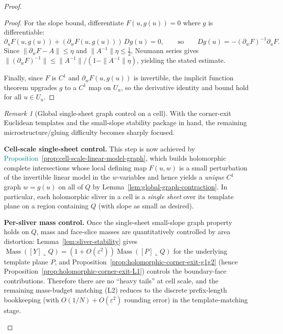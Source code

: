 \documentclass[11pt]{article}
\newcommand{\REVMZ}[1]{\textcolor{teal}{#1}}  %
\numberwithin{equation}{section}  %
\theoremstyle{plain}
\theoremstyle{definition}
\theoremstyle{remark}
\newtheorem{remark}[theorem]{Remark}
\DeclareMathOperator{\Mass}{Mass}
\begin{document}
\begin{proof}
\begin{proof}
For the slope bound, differentiate $F(u,g(u))=0$ where $g$ is differentiable:
\[
\partial_uF(u,g(u)) + (\partial_wF(u,g(u)))\,Dg(u)=0,
\qquad\text{so}\qquad
Dg(u)=-(\partial_wF)^{-1}\partial_uF.
\]
Since $\|\partial_wF-A\|\le \eta$ and $\|A^{-1}\|\eta\le \tfrac12$, Neumann series gives
$\|(\partial_wF)^{-1}\|\le \|A^{-1}\|/(1-\|A^{-1}\|\eta)$, yielding the stated estimate.


Finally, since $F$ is $C^1$ and $\partial_wF(u,g(u))$ is invertible, the implicit function theorem upgrades $g$ to a $C^1$ map on $U_u$, so the derivative identity and bound hold for all $u\in U_u$.


\end{proof}


\begin{remark}[Global single-sheet graph control on a cell]\label{rem:graph-whole-cell}
With the corner-exit Euclidean templates and the small-slope stability package in hand, the remaining microstructure/gluing
difficulty becomes sharply focused.

\smallskip\noindent

\textbf{Cell-scale single-sheet control.}
This step is now achieved by \REVMZ{Proposition~\ref{prop:cell-scale-linear-model-graph}}, which builds holomorphic complete intersections
whose local defining map $F(u,w)$ is a small perturbation of the invertible linear model in the $w$-variables and hence yields a \emph{unique}
$C^1$ graph $w=g(u)$ on all of $Q$ by Lemma~\ref{lem:global-graph-contraction}.
In particular, each holomorphic sliver in a cell is a \emph{single sheet} over its template plane on a region containing $Q$ (with slope as small as desired).

\smallskip\noindent
\textbf{Per-sliver mass control.}
Once the single-sheet small-slope graph property holds on $Q$, mass and face-slice masses are quantitatively controlled by area distortion:
Lemma~\ref{lem:sliver-stability} gives $\Mass([Y]\llcorner Q)=(1+O(\varepsilon^2))\Mass([P]\llcorner Q)$ for the underlying template plane $P$,
and Proposition~\ref{prop:holomorphic-corner-exit-g1g2} (hence Proposition~\ref{prop:holomorphic-corner-exit-L1}) controls the boundary-face contributions.
Therefore there are no ``heavy tails'' at cell scale, and the remaining mass-budget matching (L2) reduces to the discrete prefix-length bookkeeping
(with $O(1/N)+O(\varepsilon^2)$ rounding error) in the template-matching stage.


\end{remark}
\end{proof}
\end{document}
